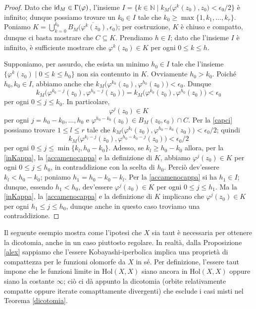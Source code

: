 \begin{proof}
    Dato che $\operatorname{id}_M\in\Gamma(\varphi)$, l'insieme $I=\{k\in\mathbb{N}\mid k_M\big(\varphi^k(z_0),z_0\big)<\epsilon_0/2\}$ è infinito; dunque possiamo trovare un $k_0 \in I$ tale che $k_0 \ge \max\{1,k_1,\dots,k_r\}$. Poniamo $\displaystyle K=\bigcup_{k=0}^{k_0}\overline{B_M\big(\varphi^k(z_0),\epsilon_0\big)}$; per costruzione, $K$ è chiuso e compatto, dunque ci basta mostrare che $C \subseteq K$. Prendiamo $h \in I$; dato che l'insieme $I$ è infinito, è sufficiente mostrare che $\varphi^k(z_0) \in K$ per ogni $0 \le k \le h$.

    Supponiamo, per assurdo, che esista un minimo $h_0 \in I$ tale che l'insieme $\{\varphi^k(z_0)\mid 0\le k\le h_0\}$ non sia contenuto in $K$. Ovviamente $h_0>k_0$. Poiché $h_0,k_0 \in I$, abbiamo anche che $k_M\big(\varphi^{k_0}(z_0),\varphi^{h_0}(z_0)\big)<\epsilon_0$. Dunque
    $$k_M\big(\varphi^{k_0-j}(z_0),\varphi^{h_0-j}(z_0)\big)=k_M\big(\varphi^{k_0}(z_0),\varphi^{h_0}(z_0)\big)<\epsilon_0$$
    per ogni $0 \le j \le k_0$. In particolare,
    \begin{equation} \label{inKappa}
        \varphi^j(z_0) \in K
    \end{equation}
    per ogni $j=h_0-k_0,\dots,h_0$ e $\varphi^{h_0-k_0}(z_0)\in B_M(z_0,\epsilon_0)\cap C$. Per la \eqref{capci} possiamo trovare $1 \le l \le r$ tale che $k_M\big(\varphi^{k_l}(z_0),\varphi^{h_0-k_0}(z_0)\big)<\epsilon_0/2$; quindi
    \begin{equation} \label{accamenocappa}
        k_M\big(\varphi^{k_l-j}(z_0),\varphi^{h_0-k_0-j}(z_0)\big)<\epsilon_0/2
    \end{equation}
    per ogni $0 \le j \le \min\{k_l,h_0-k_0\}$. Adesso, se $k_l \ge h_0-k_0$ allora, per la \eqref{inKappa}, la \eqref{accamenocappa} e la definizione di $K$, abbiamo $\varphi^j(z_0) \in K$ per ogni $0 \le j \le h_0$, in contraddizione con la scelta di $h_0$. Perciò dev'essere $k_l<h_0-k_0$; poniamo $h_1=h_0-k_0-k_l$. Per la \eqref{accamenocappa} si ha $h_1 \in I$; dunque, essendo $h_1<h_0$, dev'essere $\varphi^j(z_0) \in K$ per ogni $0 \le j \le h_1$. Ma la \eqref{inKappa}, la \eqref{accamenocappa} e la definizione di $K$ implicano che $\varphi^j(z_0) \in K$ per ogni $h_1 \le j \le h_0$, dunque anche in questo caso troviamo una contraddizione.
\end{proof}

Il seguente esempio mostra come l'ipotesi che $X$ sia taut è necessaria per ottenere la dicotomia, anche in un caso piuttosto regolare. In realtà, dalla Proposizione \ref{alex} sappiamo che l'essere Kobayashi-iperbolica implica una proprietà di compattezza per le funzioni olomorfe da $X$ in sé. Per definizione, l'essere taut impone che le funzioni limite in $\text{Hol}(X,X)$ siano ancora in $\text{Hol}(X,X)$ oppure siano la costante $\infty$; ciò ci dà appunto la dicotomia (orbite relativamente compatte oppure iterate comapttamente divergenti) che esclude i casi misti nel Teorema \ref{dicotomia}.

